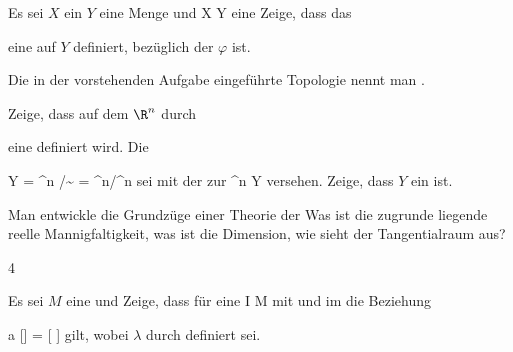 {}
{

Es sei $X$ ein
$Y$ eine Menge und
\maabbdisp {\varphi} { X } { Y
} {}
eine
Zeige, dass das

 {  }

eine
auf $Y$ definiert, bezüglich der $\varphi$
ist.

}
{} {}

Die in der vorstehenden Aufgabe eingeführte Topologie nennt man  {.}

{}
{

Zeige, dass auf dem $\R^n$ durch

 {  }

eine
definiert wird. Die

\mavergleichskettedisp
{\vergleichskette
{Y
}
{ =} {\R^n /\!\!\sim
}
{ =} {\R^n/\Z^n
}
{ } {
}
{ } {
}
}
{}{}{}
sei mit der
zur
\maabb {\varphi} {\R^n } { Y
} {}
versehen. Zeige, dass $Y$ ein
ist.

}
{} {}

{}
{

Man entwickle die Grundzüge einer Theorie der  Was ist die zugrunde liegende reelle Mannigfaltigkeit, was ist die
 {} {}
Dimension, wie sieht der Tangentialraum aus?

}
{} {}


{4}
{

Es sei $M$ eine
 und
 Zeige, dass für eine
\maabbdisp {\gamma} { I } { M
} {}
mit
 und
 im
 die Beziehung

\mavergleichskettedisp
{\vergleichskette
{a [\gamma]
}
{ =} { [  \lambda]
}
{ } {
}
{ } {
}
{ } {
}
}
{}{}{} gilt, wobei $\lambda$ durch
 definiert sei.

}
{} {}


